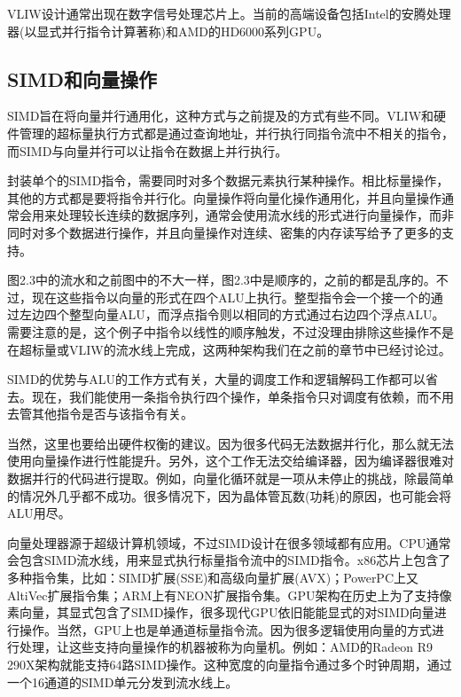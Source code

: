 VLIW设计通常出现在数字信号处理芯片上。当前的高端设备包括Intel的安腾处理器(以显式并行指令计算著称)和AMD的HD6000系列GPU。

\subsection{SIMD和向量操作}

SIMD旨在将向量并行通用化，这种方式与之前提及的方式有些不同。VLIW和硬件管理的超标量执行方式都是通过查询地址，并行执行同指令流中不相关的指令，而SIMD与向量并行可以让指令在数据上并行执行。

封装单个的SIMD指令，需要同时对多个数据元素执行某种操作。相比标量操作，其他的方式都是要将指令并行化。向量操作将向量化操作通用化，并且向量操作通常会用来处理较长连续的数据序列，通常会使用流水线的形式进行向量操作，而非同时对多个数据进行操作，并且向量操作对连续、密集的内存读写给予了更多的支持。

图2.3中的流水和之前图中的不大一样，图2.3中是顺序的，之前的都是乱序的。不过，现在这些指令以向量的形式在四个ALU上执行。整型指令会一个接一个的通过左边四个整型向量ALU，而浮点指令则以相同的方式通过右边四个浮点ALU。需要注意的是，这个例子中指令以线性的顺序触发，不过没理由排除这些操作不是在超标量或VLIW的流水线上完成，这两种架构我们在之前的章节中已经讨论过。


SIMD的优势与ALU的工作方式有关，大量的调度工作和逻辑解码工作都可以省去。现在，我们能使用一条指令执行四个操作，单条指令只对调度有依赖，而不用去管其他指令是否与该指令有关。

当然，这里也要给出硬件权衡的建议。因为很多代码无法数据并行化，那么就无法使用向量操作进行性能提升。另外，这个工作无法交给编译器，因为编译器很难对数据并行的代码进行提取。例如，向量化循环就是一项从未停止的挑战，除最简单的情况外几乎都不成功。很多情况下，因为晶体管瓦数(功耗)的原因，也可能会将ALU用尽。

向量处理器源于超级计算机领域，不过SIMD设计在很多领域都有应用。CPU通常会包含SIMD流水线，用来显式执行标量指令流中的SIMD指令。x86芯片上包含了多种指令集，比如：SIMD扩展(SSE)和高级向量扩展(AVX)；PowerPC上又AltiVec扩展指令集；ARM上有NEON扩展指令集。GPU架构在历史上为了支持像素向量，其显式包含了SIMD操作，很多现代GPU依旧能能显式的对SIMD向量进行操作。当然，GPU上也是单通道标量指令流。因为很多逻辑使用向量的方式进行处理，让这些支持向量操作的机器被称为向量机。例如：AMD的Radeon R9 290X架构就能支持64路SIMD操作。这种宽度的向量指令通过多个时钟周期，通过一个16通道的SIMD单元分发到流水线上。

